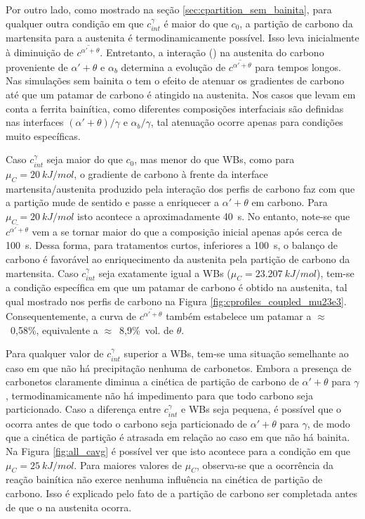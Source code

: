 Por outro lado, como mostrado na seção \ref{sec:cpartition_sem_bainita}, para qualquer outra condição em que $c^\gamma_{int}$ é maior do que $c_0$, a partição de carbono da martensita para a austenita é termodinamicamente possível. Isso leva inicialmente à diminuição de $\overline{c^{\alpha' + \theta}}$. Entretanto, a interação () na austenita do carbono proveniente de $\alpha' + \theta$ e $\alpha_b$ determina a evolução de $\overline{c^{\alpha' + \theta}}$ para tempos longos. Nas simulações sem bainita o  tem o efeito de atenuar os gradientes de carbono até que um patamar de carbono é atingido na austenita. Nos casos que levam em conta a ferrita bainítica, como diferentes composições interfaciais são definidas nas interfaces $(\alpha' + \theta)/\gamma$ e $\alpha_b/\gamma$, tal atenuação ocorre apenas para condições muito específicas.

Caso $c^\gamma_{int}$ seja maior do que $c_0$, mas menor do que WBs, como para $\mu_C = \SI{20}{kJ/mol}$, o gradiente de carbono à frente da interface martensita/austenita produzido pela interação dos perfis de carbono faz com que a partição mude de sentido e passe a enriquecer a $\alpha' + \theta$ em carbono. Para $\mu_C = \SI{20}{kJ/mol}$ isto acontece a aproximadamente 40~s. No entanto, note-se que $\overline{c^{\alpha' + \theta}}$ vem a se tornar maior do que a composição inicial apenas após cerca de 100~s. Dessa forma, para tratamentos curtos, inferiores a 100~s, o balanço de carbono é favorável ao enriquecimento da austenita pela partição de carbono da martensita. Caso $c^\gamma_{int}$ seja exatamente igual a WBs ($\mu_C = \SI{23.207}{kJ/mol}$), tem-se a condição específica em que um patamar de carbono é obtido na austenita, tal qual mostrado nos perfis de carbono na Figura \ref{fig:cprofiles_coupled_mu23e3}. Consequentemente, a curva de $\overline{c^{\alpha' + \theta}}$ também estabelece um patamar a $\approx$~0,58\%, equivalente a $\approx$~8,9\%~vol. de $\theta$.

Para qualquer valor de $c^\gamma_{int}$ superior a WBs, tem-se uma situação semelhante ao caso em que não há precipitação nenhuma de carbonetos. Embora a presença de carbonetos claramente diminua a cinética de partição de carbono de $\alpha' + \theta$ para $\gamma$, termodinamicamente não há impedimento para que todo carbono seja particionado. Caso a diferença entre $c^\gamma_{int}$ e WBs seja pequena, é possível que o  ocorra antes de que todo o carbono seja particionado de $\alpha' + \theta$ para $\gamma$, de modo que a cinética de partição é atrasada em relação ao caso em que não há bainita. Na Figura \ref{fig:all_cavg} é possível ver que isto acontece para a condição em que $\mu_C = \SI{25}{kJ/mol}$. Para maiores valores de $\mu_C$, observa-se que a ocorrência da reação bainítica não exerce nenhuma influência na cinética de partição de carbono. Isso é explicado pelo fato de a partição de carbono ser completada antes de que o  na austenita ocorra.

